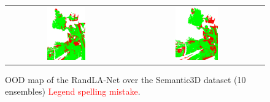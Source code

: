 \begin{figure}[h!]
\begin{tabular}{cc}
            \includegraphics[width=0.33\textwidth, height=0.18\textheight]{images/ood_imgs/sem3d_of/prob/fout_sem3d_OOD_3.pdf}&
            \includegraphics[width=0.33\textwidth, height=0.18\textheight]{images/ood_imgs/sem3d_of/prob/fout_sem3d_of_OOD_3.pdf}\\
        \end{tabular}
        \caption{OOD map of the RandLA-Net over the Semantic3D dataset (10 ensembles) \textcolor{red}{Legend spelling mistake}.}
        \label{fig:fout_oodmap_sem3d_OF_prob}
    \end{figure} 

